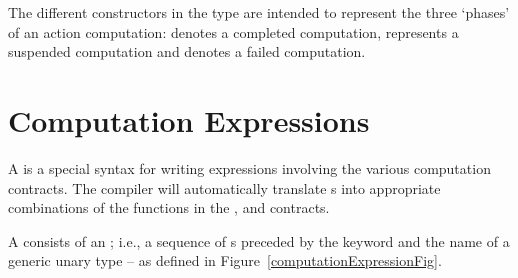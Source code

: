 The different constructors in the  type are intended to represent the three `phases' of an action computation:  denotes a completed computation,  represents a suspended computation and  denotes a failed computation.

%

\section{Computation Expressions}
\label{computationExpression}

A  is a special syntax for writing expressions involving the various computation contracts. The compiler will automatically translate s into appropriate combinations of the functions in the ,  and  contracts.

A  consists of an ; i.e., a sequence of s preceded by the  keyword and the name of a generic unary type -- as defined in Figure~\vref{computationExpressionFig}.

